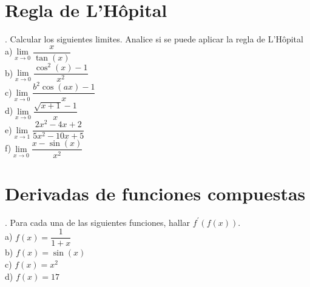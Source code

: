 \documentclass[letterpaper]{article}
\newcommand{\fp}[1]{#1^{\prime}}
\begin{document}
\section*{Regla de L’Hôpital}

. Calcular los siguientes limites. Analice si se puede aplicar la regla de L’Hôpital\\

a)$ \lim\limits_{ x \rightarrow 0} \dfrac{x}{\tan(x)} $\\


b)$ \lim\limits_{ x \rightarrow 0} \dfrac{\cos^{2}(x) -1}{x^{2}} $\\


c)$ \lim\limits_{ x \rightarrow 0} \dfrac{b^{2}\cos(ax) -1}{x} $\\


d)$ \lim\limits_{ x \rightarrow 0} \dfrac{\sqrt{x+1} -1}{x} $\\


e)$ \lim\limits_{ x \rightarrow 1} \dfrac{2x^{2}-4x+2}{5x^{2}-10x+5} $\\


f)$ \lim\limits_{ x \rightarrow 0} \dfrac{x- \sin(x)}{x^{2}} $\\


\section*{Derivadas de funciones compuestas}

. Para cada una de las siguientes funciones, hallar $ \fp{f} (f (x)) $.\\

a) $ f(x) = \dfrac{1}{1+x} $\\


b) $ f(x) = \sin(x) $\\


c) $ f(x) = x^{2} $\\


d) $ f(x) = 17 $\\
\end{document}
